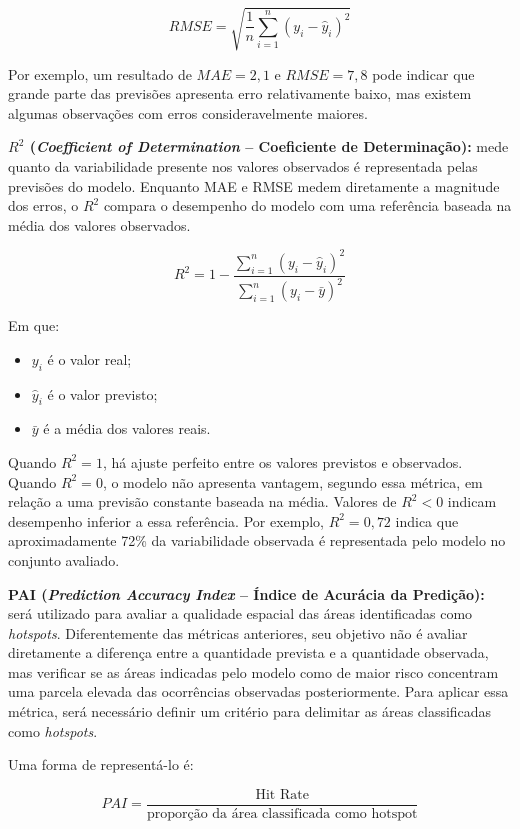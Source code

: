 \documentclass[12pt]{article}
\begin{document}
\[
RMSE =
\sqrt{
\frac{1}{n}
\sum_{i=1}^{n}
(y_i-\hat{y}_i)^2
}
\]

Por exemplo, um resultado de $MAE = 2{,}1$ e $RMSE = 7{,}8$ pode indicar que grande parte das previsões apresenta erro relativamente baixo, mas existem algumas observações com erros consideravelmente maiores.

\vspace{1.2cm}
\noindent
\textbf{$R^2$ (\textit{Coefficient of Determination} -- Coeficiente de Determinação):} mede quanto da variabilidade presente nos valores observados é representada pelas previsões do modelo. Enquanto MAE e RMSE medem diretamente a magnitude dos erros, o $R^2$ compara o desempenho do modelo com uma referência baseada na média dos valores observados.

\[
R^2 =
1 -
\frac{
\sum_{i=1}^{n}(y_i-\hat{y}_i)^2
}{
\sum_{i=1}^{n}(y_i-\bar{y})^2
}
\]

Em que:
\begin{itemize}
    \item $y_i$ é o valor real;
    \item $\hat{y}_i$ é o valor previsto;
    \item $\bar{y}$ é a média dos valores reais.
\end{itemize}

Quando $R^2 = 1$, há ajuste perfeito entre os valores previstos e observados. Quando $R^2 = 0$, o modelo não apresenta vantagem, segundo essa métrica, em relação a uma previsão constante baseada na média. Valores de $R^2 < 0$ indicam desempenho inferior a essa referência. Por exemplo, $R^2 = 0{,}72$ indica que aproximadamente 72\% da variabilidade observada é representada pelo modelo no conjunto avaliado.

\vspace{1.2cm}
\noindent
\textbf{PAI (\textit{Prediction Accuracy Index} -- Índice de Acurácia da Predição):} será utilizado para avaliar a qualidade espacial das áreas identificadas como \textit{hotspots}. Diferentemente das métricas anteriores, seu objetivo não é avaliar diretamente a diferença entre a quantidade prevista e a quantidade observada, mas verificar se as áreas indicadas pelo modelo como de maior risco concentram uma parcela elevada das ocorrências observadas posteriormente. Para aplicar essa métrica, será necessário definir um critério para delimitar as áreas classificadas como \textit{hotspots}.

Uma forma de representá-lo é:

\[
PAI =
\frac{\text{Hit Rate}}{\text{proporção da área classificada como hotspot}}
\]
\end{document}
